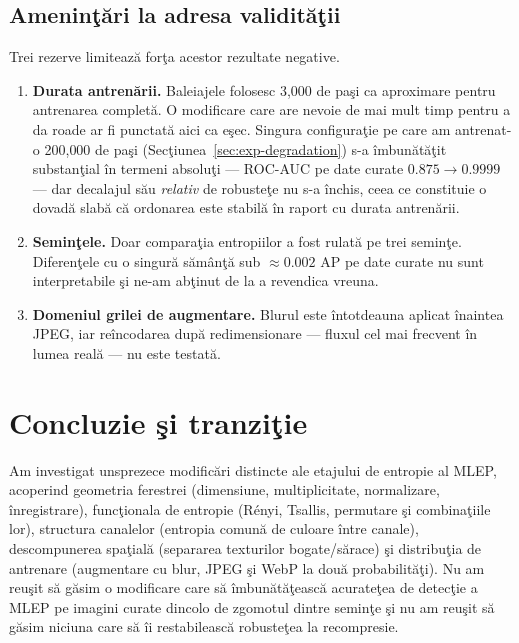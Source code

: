 \subsection{Ameninţări la adresa validităţii}

Trei rezerve limitează forţa acestor rezultate negative.

\begin{enumerate}
  \item \textbf{Durata antrenării.} Baleiajele folosesc 3{,}000 de paşi ca
    aproximare pentru antrenarea completă. O modificare care are nevoie de mai
    mult timp pentru a da roade ar fi punctată aici ca eşec. Singura
    configuraţie pe care am antrenat-o 200{,}000 de paşi
    (Secţiunea~\ref{sec:exp-degradation}) s-a îmbunătăţit substanţial în termeni
    absoluţi --- ROC-AUC pe date curate $0.875 \to 0.9999$ --- dar decalajul său
    \emph{relativ} de robusteţe nu s-a închis, ceea ce constituie o dovadă slabă
    că ordonarea este stabilă în raport cu durata antrenării.
  \item \textbf{Seminţele.} Doar comparaţia entropiilor a fost rulată pe trei
    seminţe. Diferenţele cu o singură sămânţă sub $\approx0.002$ AP pe date
    curate nu sunt interpretabile şi ne-am abţinut de la a revendica vreuna.
  \item \textbf{Domeniul grilei de augmentare.} Blurul este întotdeauna aplicat
    înaintea JPEG, iar reîncodarea după redimensionare --- fluxul cel mai
    frecvent în lumea reală --- nu este testată.
\end{enumerate}

\section{Concluzie şi tranziţie}
\label{sec:conclusion}

Am investigat unsprezece modificări distincte ale etajului de entropie al MLEP,
acoperind geometria ferestrei (dimensiune, multiplicitate, normalizare,
înregistrare), funcţionala de entropie (Rényi, Tsallis, permutare şi
combinaţiile lor), structura canalelor (entropia comună de culoare între
canale), descompunerea spaţială (separarea texturilor bogate/sărace) şi
distribuţia de antrenare (augmentare cu blur, JPEG şi WebP la două
probabilităţi). Nu am reuşit să găsim o modificare care să îmbunătăţească
acurateţea de detecţie a MLEP pe imagini curate dincolo de zgomotul dintre
seminţe şi nu am reuşit să găsim niciuna care să îi restabilească robusteţea la
recompresie.

